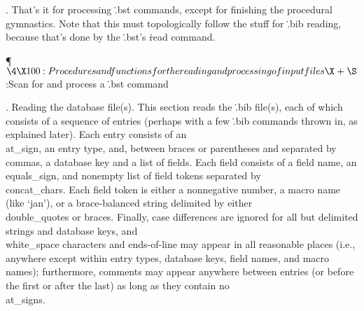 .
That's it for processing \.{.bst} commands, except for finishing the
procedural gymnastics.  Note that this must topologically follow the
stuff for \.{.bib} reading, because that's done by the \.{.bst}'s
\.{read} command.

\Y\P$\4\X100:Procedures and functions for the reading and processing of input
files\X\mathrel{+}\S$\6
:Scan for and process a \.{.bst} command\X\par
\fi

.  Reading the database file(s).
This section reads the \.{.bib} file(s), each of which consists of a
sequence of entries (perhaps with a few \.{.bib} commands thrown in,
as explained later).  Each entry consists of an \\{at\_sign}, an entry
type, and, between braces or parentheses and separated by \\{comma}s, a
database key and a list of fields.  Each field consists of a field
name, an \\{equals\_sign}, and nonempty list of field tokens separated by
\\{concat\_char}s.  Each field token is either a nonnegative number, a
macro name (like `jan'), or a brace-balanced string delimited by
either \\{double\_quote}s or braces.  Finally, case differences are
ignored for all but delimited strings and database keys, and
\\{white\_space} characters and ends-of-line may appear in all reasonable
places (i.e., anywhere except within entry types, database keys, field
names, and macro names); furthermore, comments may appear anywhere
between entries (or before the first or after the last) as long as
they contain no \\{at\_sign}s.


\fi

